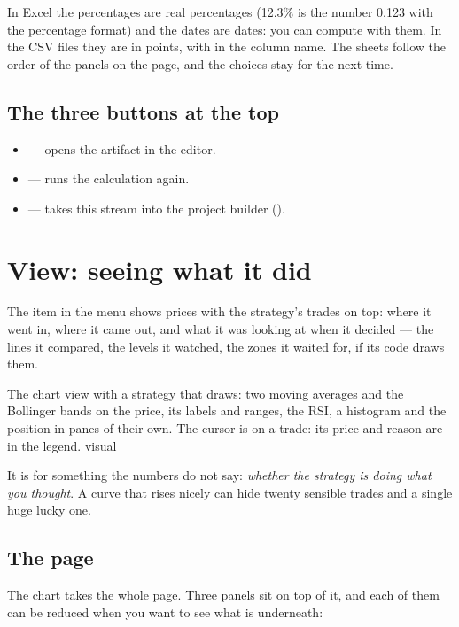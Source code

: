 \noindent
In Excel the percentages are real percentages (\num{12.3}\% is the number
\num{0.123} with the percentage format) and the dates are dates: you can
compute with them. In the CSV files they are in points, with \voce{(\%)} in
the column name. The sheets follow the order of the panels on the page, and
the choices stay for the next time.

\subsection{The three buttons at the top}

\begin{itemize}
  \item {} --- opens the artifact in the
    editor.
  \item {} --- runs the calculation again.
  \item {} --- takes this stream into the project
    builder ().
\end{itemize}

\section{View: seeing what it did}\label{sez:view}

The  item in the menu shows prices with the strategy's trades on
top: where it went in, where it came out, and what it was looking at when it
decided --- the lines it compared, the levels it watched, the zones it
waited for, if its code draws them.

  {The chart view with a strategy that draws: two moving averages and the
   Bollinger bands on the price, its labels and ranges, the RSI, a histogram
   and the position in panes of their own. The cursor is on a trade: its
   price and reason are in the legend.}
  {visual}

\noindent
It is for something the numbers do not say: \emph{whether the strategy is
doing what you thought}. A curve that rises nicely can hide twenty sensible
trades and a single huge lucky one.

\subsection{The page}\label{sez:view-page}

The chart takes the whole page. Three panels sit on top of it, and each of
them can be reduced when you want to see what is underneath:

